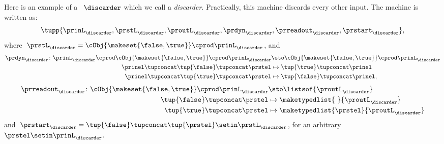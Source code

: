 {\begin{example}[Discarder]
    Here is an example of a ~$\discarder$ which we call a \emph{discarder}.
    Practically, this machine discards every other input.
    The machine is written as:
    \begin{equation}
        \tupp{\prinL_{\discarder},\prstL_{\discarder},\proutL_{\discarder},\prdyn_{\discarder},\prreadout_{\discarder},\prstart_{\discarder}},
    \end{equation}
    where~$\prstL_{\discarder}= \cObj{\makeset{\false,\true}} \cprod \prinL_\discarder$, and
    \begin{equation}
        \begin{aligned}
            \prdyn_\discarder\colon \prinL_\discarder \cprod \cObj{\makeset{\false,\true}} \cprod \prinL_\discarder & \sto \cObj{\makeset{\false,\true}} \cprod \prinL_\discarder \\
            \prinel \tupconcat \tup{\false} \tupconcat \prstel                                                      & \mapsto \tup{\true} \tupconcat \prinel \\
            \prinel \tupconcat \tup{\true} \tupconcat \prstel                                                       & \mapsto\tup{\false} \tupconcat \prinel,
        \end{aligned}
    \end{equation}
    \begin{equation}
        \begin{aligned}
            \prreadout_\discarder\colon \cObj{\makeset{\false,\true}} \cprod \prinL_\discarder & \sto \listsof{\proutL_\discarder} \\
            \tup{\false} \tupconcat \prstel                                                    & \mapsto \maketypedlist{ \ }{\proutL_\discarder} \\
            \tup{\true} \tupconcat \prstel                                                     & \mapsto \maketypedlist{\prstel}{\proutL_\discarder}
        \end{aligned}
    \end{equation}
    and~$\prstart_\discarder = \tup{\false} \tupconcat \tup{\prstel} \setin \prstL_\discarder$, for an arbitrary~$\prstel\setin \prinL_\discarder$.
\end{example}


}
